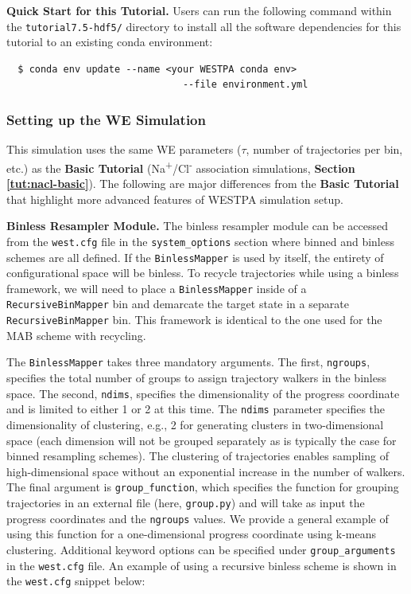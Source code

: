 \textbf{Quick Start for this Tutorial.} Users can run the following command within the \verb|tutorial7.5-hdf5/| directory to install all the software dependencies for this tutorial to an existing conda environment:

\begin{verbatim}
  $ conda env update --name <your WESTPA conda env> 
                               --file environment.yml
\end{verbatim}


\subsubsection{Setting up the WE Simulation}
This simulation uses the same WE parameters ($\tau$, number of trajectories per bin, etc.) as the \textbf{Basic Tutorial} (Na\textsuperscript{+}/Cl\textsuperscript{-} association simulations, \textbf{Section \ref{tut:nacl-basic}}). 
The following are major differences from the \textbf{Basic Tutorial} that highlight more advanced features of WESTPA simulation setup.

\textbf{Binless Resampler Module.} The binless resampler module can be accessed from the \verb|west.cfg| file in the \verb|system_options| section where binned and binless schemes are all defined. 
If the \verb|BinlessMapper| is used by itself, the entirety of configurational space will be binless. 
To recycle trajectories while using a binless framework, we will need to place a \verb|BinlessMapper| inside of a \verb|RecursiveBinMapper| bin and demarcate the target state in a separate \verb|RecursiveBinMapper| bin. 
This framework is identical to the one used for the MAB scheme with recycling.

The \verb|BinlessMapper| takes three mandatory arguments. 
The first, \verb|ngroups|, specifies the total number of groups to assign trajectory walkers in the binless space. 
The second, \verb|ndims|, specifies the dimensionality of the progress coordinate and is limited to either 1 or 2 at this time. 
The \verb|ndims| parameter specifies the dimensionality of clustering, e.g., 2 for generating clusters in two-dimensional space (each dimension will not be grouped separately as is typically the case for binned resampling schemes). 
The clustering of trajectories enables sampling of high-dimensional space without an exponential increase in the number of walkers. 
The final argument is \verb|group_function|, which specifies the function for grouping trajectories in an external file (here, \verb|group.py|) and will take as input the progress coordinates and the \verb|ngroups| values. 
We provide a general example of using this function for a one-dimensional progress coordinate using k-means clustering. 
Additional keyword options can be specified under \verb|group_arguments| in the \verb|west.cfg| file. 
An example of using a recursive binless scheme is shown in the \verb|west.cfg| snippet below:

